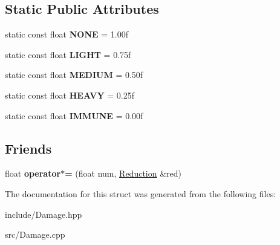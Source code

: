 \subsection*{Static Public Attributes}
\begin{DoxyCompactItemize}
\item 
\hypertarget{struct_damage_1_1_reduction_a867817a46ed62ac5b7b8b8ba7120a58a}{}static const float {\bfseries N\+O\+N\+E} = 1.\+00f\label{struct_damage_1_1_reduction_a867817a46ed62ac5b7b8b8ba7120a58a}

\item 
\hypertarget{struct_damage_1_1_reduction_ada67febdc8d5baf3978ea46fbce888fd}{}static const float {\bfseries L\+I\+G\+H\+T} = 0.\+75f\label{struct_damage_1_1_reduction_ada67febdc8d5baf3978ea46fbce888fd}

\item 
\hypertarget{struct_damage_1_1_reduction_a73158dcb1bf2809e82ea95ae9cca9918}{}static const float {\bfseries M\+E\+D\+I\+U\+M} = 0.\+50f\label{struct_damage_1_1_reduction_a73158dcb1bf2809e82ea95ae9cca9918}

\item 
\hypertarget{struct_damage_1_1_reduction_a088066d69d2c5db850fe37b216032b72}{}static const float {\bfseries H\+E\+A\+V\+Y} = 0.\+25f\label{struct_damage_1_1_reduction_a088066d69d2c5db850fe37b216032b72}

\item 
\hypertarget{struct_damage_1_1_reduction_abb2be906422a50ab4ad73e02661c272a}{}static const float {\bfseries I\+M\+M\+U\+N\+E} = 0.\+00f\label{struct_damage_1_1_reduction_abb2be906422a50ab4ad73e02661c272a}

\end{DoxyCompactItemize}
\subsection*{Friends}
\begin{DoxyCompactItemize}
\item 
\hypertarget{struct_damage_1_1_reduction_a1e5e8114fb59580f69b199798cc597c8}{}float {\bfseries operator$\ast$=} (float num, \hyperlink{struct_damage_1_1_reduction}{Reduction} \&red)\label{struct_damage_1_1_reduction_a1e5e8114fb59580f69b199798cc597c8}

\end{DoxyCompactItemize}


The documentation for this struct was generated from the following files\+:\begin{DoxyCompactItemize}
\item 
include/Damage.\+hpp\item 
src/Damage.\+cpp\end{DoxyCompactItemize}
